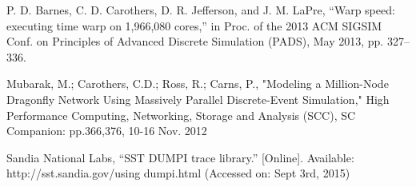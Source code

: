 \documentclass[conference]{IEEEtran}
\begin{document}
\begin{thebibliography}{10}

P. D. Barnes, C. D. Carothers, D. R. Jefferson, and J. M. LaPre, 
\newblock “Warp speed: executing time warp on 1,966,080 cores,”
\newblock in Proc. of the 2013 ACM SIGSIM Conf. on Principles of Advanced Discrete Simulation (PADS),
\newblock May 2013, pp. 327–336.

Mubarak, M.; Carothers, C.D.; Ross, R.; Carns, P.,
\newblock "Modeling a Million-Node Dragonfly Network Using Massively Parallel Discrete-Event Simulation," 
\newblock High Performance Computing, Networking, Storage and Analysis (SCC), 
 SC Companion: 
\newblock pp.366,376, 10-16 Nov. 2012

Sandia National Labs, “SST DUMPI trace library.” [Online].
\newblock Available: http://sst.sandia.gov/using dumpi.html 
\newblock (Accessed on: Sept 3rd, 2015)


\end{thebibliography}
\end{document}
